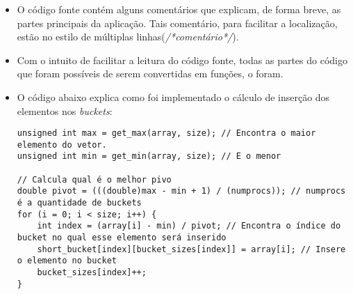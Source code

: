 		\begin{itemize}
			\item O código fonte contém alguns comentários que explicam, de forma breve, as partes principais da aplicação. Tais comentário, para facilitar a localização, estão no estilo de múltiplas linhas(\textit{/*comentário*/}).
			
			\item Com o intuito de facilitar a leitura do código fonte, todas as partes do código que foram possíveis de serem convertidas em funções, o foram.
			
			\item O código abaixo explica como foi implementado o cálculo de inserção dos elementos nos \textit{buckets}:\\
			\begin{lstlisting}[style=C] 
unsigned int max = get_max(array, size); // Encontra o maior elemento do vetor.
unsigned int min = get_min(array, size); // E o menor

// Calcula qual é o melhor pivo
double pivot = (((double)max - min + 1) / (numprocs)); // numprocs é a quantidade de buckets
for (i = 0; i < size; i++) {
	int index = (array[i] - min) / pivot; // Encontra o índice do bucket no qual esse elemento será inserido
	short_bucket[index][bucket_sizes[index]] = array[i]; // Insere o elemento no bucket
	bucket_sizes[index]++;
}
\end{lstlisting}
		\end{itemize}